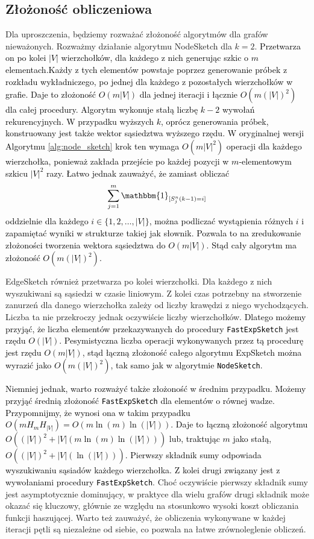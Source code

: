     \subsection{Złożoność obliczeniowa}
    \label{sec:complexity}
    Dla uproszczenia, będziemy rozważać złożoność algorytmów dla grafów nieważonych. Rozważmy działanie algorytmu NodeSketch dla $k = 2$. \textcolor{black}{Przetwarza on po kolei $|V|$ wierzchołków, dla każdego z nich generując szkic o $m$ elementach.Każdy z tych elementów powstaje poprzez generowanie próbek z rozkładu wykładniczego, po jednej dla każdego z pozostałych wierzchołków w grafie. Daje to złożoność $O(m|V|)$ dla jednej iteracji i łącznie $O(m(|V|)^2)$ dla całej procedury. Algorytm wykonuje stałą liczbę $k - 2$ wywołań rekurencyjnych. W przypadku wyższych $k$, oprócz generowania próbek, konstruowany jest także wektor sąsiedztwa wyższego rzędu. W oryginalnej wersji Algorytmu \ref{alg:node_sketch} krok ten wymaga $O(m|V|^2)$ operacji dla każdego wierzchołka, ponieważ zakłada przejście po każdej pozycji w $m$-elementowym szkicu $|V|^2$ razy. Łatwo jednak zauważyć, że zamiast obliczać 
    \[
        \sum\limits_{j = 1}^{m} \mathbbm{1}_{[S_{j}^{n}(k - 1) = i]}
    \]
    oddzielnie dla każdego $i \in \{1,2,\dots,|V|\}$, można podliczać wystąpienia różnych $i$ i zapamiętać wyniki w strukturze takiej jak słownik. Pozwala to na zredukowanie złożoności tworzenia wektora sąsiedztwa do $O(m|V|)$. Stąd cały algorytm ma złożoność $O(m(|V|)^2)$.}
    
     EdgeSketch również przetwarza po kolei wierzchołki. Dla każdego z nich wyszukiwani są sąsiedzi w czasie liniowym. Z kolei czas potrzebny na stworzenie zanurzeń dla danego wierzchołka zależy od liczby krawędzi z niego wychodzących. Liczba ta nie przekroczy jednak oczywiście liczby wierzchołków. \textcolor{black}{Dlatego możemy przyjąć, że liczba elementów przekazywanych do procedury \texttt{FastExpSketch} jest rzędu $O(|V|)$. Pesymistyczna liczba operacji wykonywanych przez tą procedurę jest rzędu $O(m|V|)$, stąd łączną złożoność całego algorytmu ExpSketch można wyrazić jako $O(m(|V|)^2)$, tak samo jak w algorytmie \texttt{NodeSketch}.} 
     
     \textcolor{black}{Niemniej jednak, warto rozważyć także złożoność w średnim przypadku. Możemy przyjąć średnią złożoność \texttt{FastExpSketch} dla elementów o równej wadze. Przypomnijmy, że wynosi ona w takim przypadku $O(m H_m H_{|V|}) = O(m \ln(m) \ln(|V|))$. Daje to łączną złożoność algorytmu $O((|V|)^2 + |V|(m \ln(m) \ln(|V|)))$ lub, traktując $m$ jako stałą, $O((|V|)^2 + |V|(\ln(|V|)))$. Pierwszy składnik sumy odpowiada wyszukiwaniu sąsiadów każdego wierzchołka. Z kolei drugi związany jest z wywołaniami procedury  \texttt{FastExpSketch}}. Choć oczywiście pierwszy składnik sumy jest asymptotycznie dominujący, w praktyce dla wielu grafów drugi składnik może okazać się kluczowy, głównie ze względu na stosunkowo wysoki koszt obliczania funkcji haszującej. Warto też zauważyć, że obliczenia wykonywane w każdej iteracji pętli są niezależne od siebie, co pozwala na łatwe zrównoleglenie obliczeń. 
     
